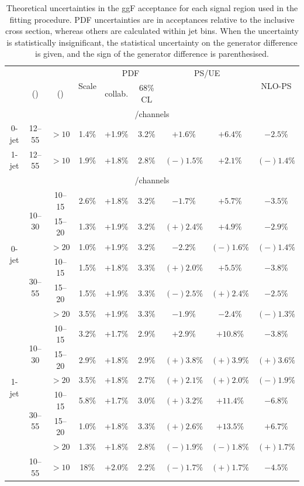 \begin{table}[p]
	\centering
	\begin{tabular}{ccc|cccccc}
		\toprule
		& \mll & \ptsubleadlep & \multirow{2}{*}{Scale} & \multicolumn{2}{c}{PDF} & \multicolumn{2}{c}{PS/UE} & \multirow{2}{*}{NLO-PS} \\
		& (\GeV) & (\GeV) & & collab. & 68\% CL & \pythia{6} & \fherwig & \\
		\midrule
		\multicolumn{9}{c}{\eech/\mmch channels} \\
		\midrule
		0-jet & 12--55 & $>10$ & 1.4\% & +1.9\% & 3.2\% &   $+1.6\%$ & $+6.4\%$ &   $-2.5\%$ \\
		1-jet & 12--55 & $>10$ & 1.9\% & +1.8\% & 2.8\% & $(-)1.5\%$ & $+2.1\%$ & $(-)1.4\%$ \\
		\midrule
		\multicolumn{9}{c}{\emch/\mech channels} \\
		\midrule
		\multirow{6}{*}{0-jet}
		& \multirow{3}{*}{10--30}
	    &  10--15 & 2.6\% & +1.8\% & 3.2\% &   $-1.7\%$ &   $+5.7\%$ &   $-3.5\%$ \\
		&& 15--20 & 1.3\% & +1.9\% & 3.2\% & $(+)2.4\%$ &   $+4.9\%$ &   $-2.9\%$ \\
		&&  $>20$ & 1.0\% & +1.9\% & 3.2\% &   $-2.2\%$ & $(-)1.6\%$ & $(-)1.4\%$ \\
		\cmidrule(lr){2-9}
		& \multirow{3}{*}{30--55}
		&  10--15 & 1.5\% & +1.8\% & 3.3\% & $(+)2.0\%$ &   $+5.5\%$ &   $-3.8\%$ \\
		&& 15--20 & 1.5\% & +1.9\% & 3.3\% & $(-)2.5\%$ & $(+)2.4\%$ &   $-2.5\%$ \\
		&&  $>20$ & 3.5\% & +1.9\% & 3.3\% &   $-1.9\%$ &   $-2.4\%$ & $(-)1.3\%$ \\
		\cmidrule(lr){1-9}
		\multirow{6}{*}{1-jet}
		& \multirow{3}{*}{10--30}
	    &  10--15 & 3.2\% & +1.7\% & 2.9\% &   $+2.9\%$ &  $+10.8\%$ &   $-3.8\%$ \\
		&& 15--20 & 2.9\% & +1.8\% & 2.9\% & $(+)3.8\%$ & $(+)3.9\%$ & $(+)3.6\%$ \\
		&&  $>20$ & 3.5\% & +1.8\% & 2.7\% & $(+)2.1\%$ & $(+)2.0\%$ & $(-)1.9\%$ \\
		\cmidrule(lr){2-9}
		& \multirow{3}{*}{30--55}
		&  10--15 & 5.8\% & +1.7\% & 3.0\% & $(+)3.2\%$ &  $+11.4\%$ &   $-6.8\%$ \\
		&& 15--20 & 1.0\% & +1.8\% & 3.3\% & $(+)2.6\%$ &  $+13.5\%$ &   $+6.7\%$ \\
		&&  $>20$ & 1.3\% & +1.8\% & 2.8\% & $(-)1.9\%$ & $(-)1.8\%$ & $(+)1.7\%$ \\
		\cmidrule(lr){1-9}
		\twojet & 10--55 & $>10$ &  18\% & +2.0\% & 2.2\% & $(-)1.7\%$ & $(+)1.7\%$ & $-4.5\%$ \\
		\bottomrule
	\end{tabular}
	\caption{Theoretical uncertainties in the ggF acceptance for each signal region used 
	in the fitting procedure. PDF uncertainties are in acceptances relative to the 
	inclusive cross section, whereas others are calculated within jet bins. When the 
	uncertainty is statistically insignificant, the statistical uncertainty on the 
	generator difference is given, and the sign of the generator difference is 
	parenthesised.}
	\label{tab:signal:acc_unc}
\end{table}



